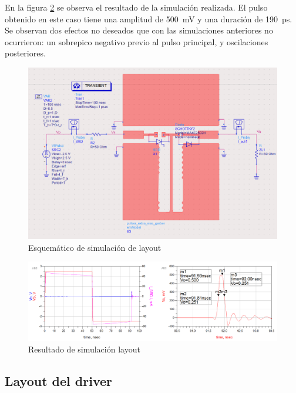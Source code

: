 En la figura \ref{fig:layout_simulation_result} se observa el resultado de la
simulación realizada. El pulso obtenido en este caso tiene una amplitud de
\qty{500}{\milli\volt} y una duración de \qty{190}{\pico\second}. Se observan
dos efectos no deseados que con las simulaciones anteriores no ocurrieron: un
sobrepico negativo previo al pulso principal, y oscilaciones posteriores.

\begin{figure}[tbp]
    \centering
    \includegraphics[width=\textwidth]{images/layout_simulation_sch.png}
    \caption{Esquemático de simulación de layout}
    \label{fig:layout_simulation_sch}
\end{figure}

\begin{figure}[tbp]
    \centering
    \includegraphics[width=\textwidth]{images/layout_simulation_result.png}
    \caption{Resultado de simulación layout}
    \label{fig:layout_simulation_result}
\end{figure}

\subsection{Layout del driver}

